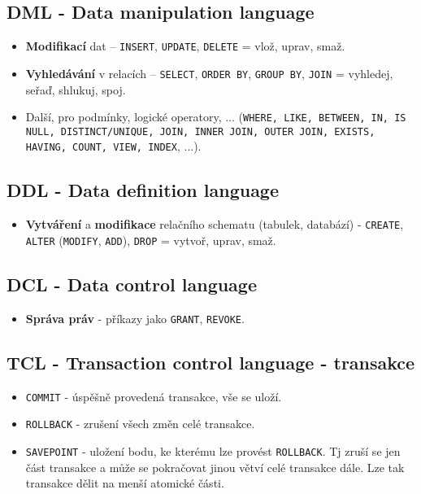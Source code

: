 \subsection{DML - Data manipulation language}
\begin{itemize}
    \item \textbf{Modifikací} dat --  \texttt{INSERT}, \texttt{UPDATE}, \texttt{DELETE} = vlož, uprav, smaž.
    \item \textbf{Vyhledávání} v relacích --  \texttt{SELECT}, \texttt{ORDER BY},  \texttt{GROUP BY}, \texttt{JOIN} = vyhledej, seřaď, shlukuj, spoj.
    \item Další, pro podmínky, logické operatory, ... (\texttt{WHERE, LIKE, BETWEEN, IN, IS NULL, DISTINCT/UNIQUE, JOIN, INNER JOIN, OUTER JOIN, EXISTS, HAVING, COUNT, VIEW, INDEX}, ...).
\end{itemize}

\subsection{DDL - Data definition language}
\begin{itemize}
    \item \textbf{Vytváření} a \textbf{modifikace} relačního schematu (tabulek, databází) - \texttt{CREATE}, \texttt{ALTER} (\texttt{MODIFY}, \texttt{ADD}), \texttt{DROP}  = vytvoř, uprav, smaž.
\end{itemize}

\subsection{DCL - Data control language}
\begin{itemize}
    \item \textbf{Správa práv} - příkazy jako \texttt{GRANT}, \texttt{REVOKE}.
\end{itemize}

\subsection{TCL - Transaction control language - transakce}
\begin{itemize}
    \item \texttt{COMMIT} - úspěšně provedená transakce, vše se uloží.
    \item \texttt{ROLLBACK} - zrušení všech změn celé transakce.
    \item \texttt{SAVEPOINT} - uložení bodu, ke kterému lze provést \texttt{ROLLBACK}. Tj zruší se jen část transakce a může se pokračovat jinou větví celé transakce dále. Lze tak transakce dělit na menší atomické části.
\end{itemize}

